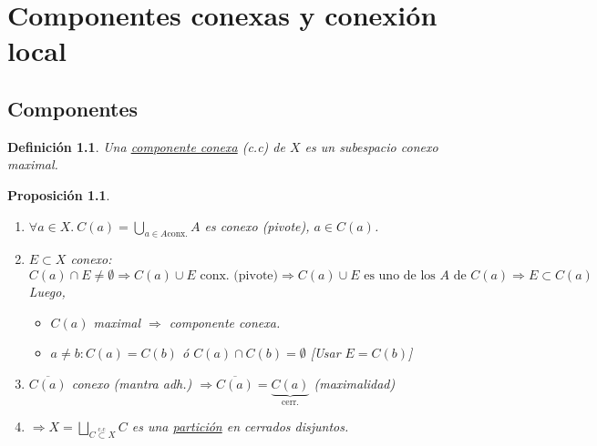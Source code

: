 \documentclass[10pt,a4paper,openright]{book}
\theoremstyle{break}
\newtheorem*{defi}{Definición}
\newtheorem*{prop}{Proposición}
\begin{document}
\chapter{Componentes conexas y conexión local}%
\label{cha:componentes_conexas_y_conexion_local}
\section{Componentes}%
\label{sec:componentes}
\begin{defi}
Una \underline{componente conexa} (c.c) de $X$ es un subespacio conexo maximal.
\end{defi}

\begin{prop}
\begin{enumerate}
    \item $\forall a \in X.\ C\left( a \right) = \bigcup_{a \in A \text{conx.}} A$ es conexo (pivote), $a \in C\left( a \right)$.
    \item $E \subset X$ conexo: 
    \[
    C\left( a \right) \cap E \neq \emptyset \Rightarrow C\left( a \right) \cup E \text{ conx. (pivote)} \Rightarrow C\left( a \right) \cup E \text{ es uno de los } A \text{ de } C\left( a \right) \Rightarrow E \subset C\left( a \right) 
    \]
    Luego, 
    \begin{itemize}
        \item $C\left( a \right)$ maximal $\Rightarrow$ componente conexa.
        \item $a \neq b: C\left( a \right) = C\left( b \right)$ ó $C\left( a \right) \cap C\left( b \right) = \emptyset$ [Usar $E = C\left( b \right)$]
    \end{itemize}

    \item $\overline{C\left( a \right)}$ conexo (mantra adh.) $\Rightarrow \overline{C\left( a \right)} = \underbrace{C\left( a \right)}_{\text{cerr.}}$ (maximalidad)
    \item[1. + 2. + 3.] $\Rightarrow X = \bigsqcup_{C \stackrel{\text{c.c}}{\subset}  X} C$ es una \underline{partición} en cerrados disjuntos.
\end{enumerate} 
\end{prop}
\end{document}
